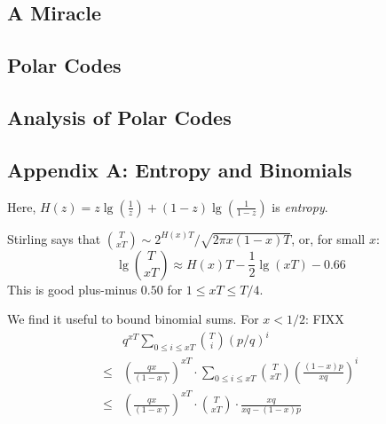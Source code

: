 \documentclass[12pt]{article}
\newcommand{\msec}[1]{\subsection*{\color{mblu}\textsf{#1}}}
\theoremstyle{definition}
\newcommand{\enc}{\text{enc}}
\begin{document}





\msec{A Miracle}


\msec{Polar Codes}
\msec{Analysis of Polar Codes}

\msec{Appendix A: Entropy and Binomials}
    Here, $H(z) = z\lg(\frac{1}{z}) +
    (1-z)\lg(\frac{1}{1-z})$ is \emph{entropy}. 

    Stirling says that ${T \choose xT} \sim 2^{H(x)T} / \sqrt{2\pi x(1-x)T}$,
    or, for small $x$:
    $$
        \lg{{T \choose xT}} \approx H(x)T - \frac{1}{2} \lg(xT) - 0.66 
    $$
    This is good plus-minus $0.50$ for $1\leq xT\leq T/4$.

    We find it useful to bound binomial sums.  For $x < 1/2$:
    FIXX
    \begin{align*}
        &
        q^{xT} \sum_{0\leq i\leq xT} {T\choose i} (p/q)^{i}
        \\ \leq &
        \left(\frac{qx}{(1-x)}\right)^{xT} \cdot
        \sum_{0\leq i\leq xT} {T\choose xT} \left(\frac{(1-x)p}{xq}\right)^i 
        \\ \leq &
        \left(\frac{qx}{(1-x)}\right)^{xT} \cdot
        {T \choose xT} \cdot \frac{xq}{xq-(1-x)p} 
    \end{align*}

\end{document}
